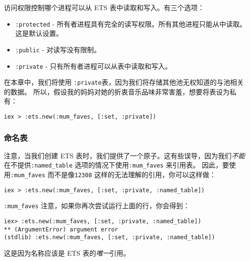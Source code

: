 访问权限控制哪个进程可以从 ETS 表中读取和写入。有三个选项：

\begin{itemize}

\item  \texttt{:protected} -  所有者进程具有完全的读写权限。所有其他进程只能从中读取。这是默认设置。
\item  \texttt{:public} - 对读写没有限制。
\item  \texttt{:private} -  只有所有者进程可以从表中读取和写入。
\end{itemize}

在本章中，我们将使用 \texttt{:private}表，因为我们将存储其他池无权知道的与池相关的数据。
所以，假设我的妈妈对她的折衷音乐品味非常害羞，想要将表设为私有：

\begin{code}{}\begin{verbatim}
iex > :ets.new(:mum_faves, [:set, :private])
\end{verbatim}
\end{code}


\subsubsection{命名表}

注意，当我们创建 ETS
表时，我们提供了一个原子。这有些误导，因为我们\emph{不能}在不提供\texttt{:named\_table} 选项的情况下使用\texttt{:mum\_faves} 来引用表。
因此，要使用\texttt{:mum\_faves} 而不是像\texttt{12308} 这样的无法理解的引用，你可以这样做：

\begin{code}{}\begin{verbatim}
iex > :ets.new(:mum_faves, [:set, :private, :named_table])
\end{verbatim}
\end{code}

\texttt{:mum\_faves}
注意，如果你再次尝试运行上面的行，你会得到：

\begin{code}{}\begin{verbatim}
iex> :ets.new(:mum_faves, [:set, :private, :named_table])
** (ArgumentError) argument error
(stdlib) :ets.new(:mum_faves, [:set, :private, :named_table])
\end{verbatim}
\end{code}

这是因为名称应该是 ETS 表的\emph{唯一}引用。


